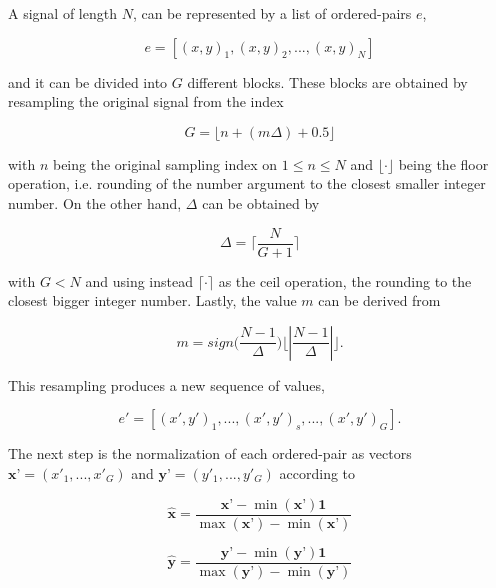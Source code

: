 A signal of length $N$, can be represented by a list of ordered-pairs $e$,

\begin{equation}
e = \left[ (x,y)_{1}, (x,y)_{2}, ..., (x,y)_{N} \right]
\label{eq:shccdelta}
\end{equation}

\noindent and it can be divided into $G$ different blocks.  These blocks are obtained by resampling the original signal from the index 

\begin{equation}
G = \lfloor n + ( m \Delta ) + 0.5 \rfloor
\label{eq:shcc2}
\end{equation}

\noindent with $n$ being the original sampling index on $ 1 \leq n \leq N $ and $\lfloor \cdot \rfloor$ being the floor operation, i.e. rounding of the number argument to the closest smaller integer number.  On the other hand, $\Delta$ can be obtained by

\begin{equation}
\Delta = \bigg \lceil \frac{N}{G+1} \bigg \rceil
\label{eq:shcc3}
\end{equation}

\noindent with $ G < N $ and using instead $\lceil \cdot \rceil$ as the ceil operation, the rounding to the closest bigger integer number. Lastly, the value $m$ can be derived from

\begin{equation}
m = sign \bigg (  \frac{N-1}{\Delta} \bigg )  \bigg \lfloor \left\lvert \frac{N-1}{\Delta} \right\lvert \bigg \rfloor.
\label{eq:shcc4}
\end{equation}

This resampling produces a new sequence of values,

\begin{equation}
e' = \left[ (x',y')_{1}, ...,(x',y')_{s}, ..., (x',y')_{G} \right].
\label{eq:shcc5}
\end{equation}

The next step is the normalization of each ordered-pair as vectors $\textbf{x'} = (x'_{1},...,x'_{G})$ and $\textbf{y'} = (y'_{1},...,y'_{G})$ according to

\begin{equation}
\hat{\textbf{x}} = \frac{\textbf{x'} - \min(\textbf{x'}) \textbf{1} }{\max(\textbf{x'}) - \min(\textbf{x'})} 
\label{eq:shcc6}
\end{equation}

\begin{equation}
\hat{\textbf{y}} = \frac{ \textbf{y'} - \min(\textbf{y'}) \textbf{1}}{\max(\textbf{y'}) - \min(\textbf{y'})} 
\label{eq:shcc7}
\end{equation}

